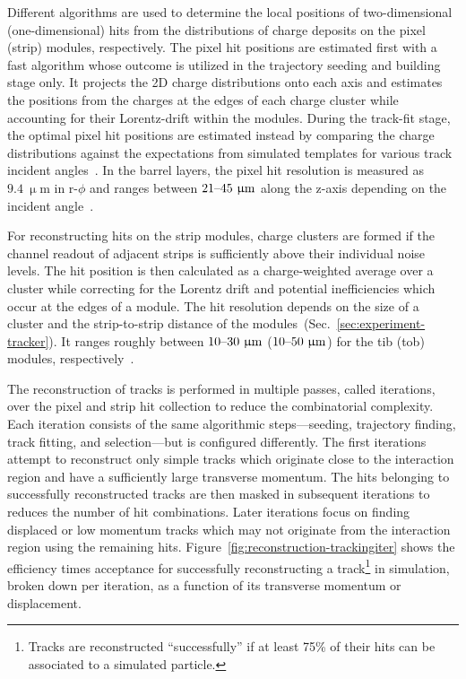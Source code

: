 Different algorithms are used to determine the local positions of two-dimensional (one-dimensional) hits from the distributions of charge deposits on the pixel (strip) modules, respectively. The pixel hit positions are estimated first with a fast algorithm whose outcome is utilized in the trajectory seeding and building stage only. It projects the 2D charge distributions onto each axis and estimates the positions from the charges at the edges of each charge cluster while accounting for their Lorentz-drift within the modules. During the track-fit stage, the optimal pixel hit positions are estimated instead by comparing the charge distributions against the expectations from simulated templates for various track incident angles~\cite{Swartz:2007zz}. In the barrel layers, the pixel hit resolution is measured as $9.4~\upmu\mathrm{m}$ in $\mathrm{r}\mbox{-}\phi$ and ranges between $21\text{--}45~\upmu\mathrm{m}$ along the z-axis depending on the incident angle~\cite{Chatrchyan:2014fea}. 

For reconstructing hits on the strip modules, charge clusters are formed if the channel readout of adjacent strips is sufficiently above their individual noise levels. The hit position is then calculated as a charge-weighted average over a cluster while correcting for the Lorentz drift and potential inefficiencies which occur at the edges of a module. The hit resolution depends on the size of a cluster and the strip-to-strip distance of the modules~(Sec.~\ref{sec:experiment-tracker}). It ranges roughly between $10\text{--}30~\upmu\mathrm{m}$ ($10\text{--}50~\upmu\mathrm{m}$) for the \gls{tib} (\gls{tob}) modules, respectively~\cite{Chatrchyan:2014fea}.

The reconstruction of tracks is performed in multiple passes, called iterations, over the pixel and strip hit collection to reduce the combinatorial complexity. Each iteration consists of the same algorithmic steps---seeding, trajectory finding, track fitting, and selection---but is configured differently. The first iterations attempt to reconstruct only simple tracks which originate close to the interaction region and have a sufficiently large transverse momentum. The hits belonging to successfully reconstructed tracks are then masked in subsequent iterations to reduces the number of hit combinations. Later iterations focus on finding displaced or low momentum tracks which may not originate from the interaction region using the remaining hits. Figure~\ref{fig:reconstruction-trackingiter} shows the efficiency times acceptance for successfully reconstructing a track\footnote{Tracks are reconstructed ``successfully'' if at least 75\% of their hits can be associated to a simulated particle.} in simulation, broken down per iteration, as a function of its transverse momentum or displacement.

